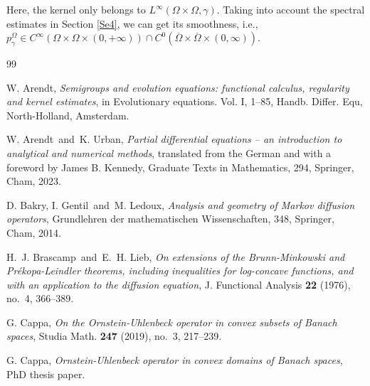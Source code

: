 \documentclass[12pt]{amsart}
\newcommand{\1}{\mathbf 1}
\begin{document}
Here, the kernel only belongs to $L^{\infty}(\Omega\times \Omega,\gamma)$. Taking into account the spectral estimates in Section \ref{Se4}, we can get its smoothness, i.e., $p^\Omega_\gamma\in C^{\infty}(\Omega \times \Omega \times (0,+\infty)) \cap C^{0}(\overline{\Omega}\times \overline{\Omega}\times (0,\infty))$.





\begin{thebibliography}{99}

W. Arendt, {\it Semigroups and evolution equations: functional calculus, regularity and kernel estimates}, in Evolutionary equations. Vol. I, 1--85, Handb. Differ. Equ, North-Holland, Amsterdam.

W. Arendt\ and\ K. Urban, {\em Partial differential equations -- an introduction to analytical and numerical methods}, translated from the German and with a foreword by James B. Kennedy, Graduate Texts in Mathematics, 294, Springer, Cham, 2023.


D. Bakry, I. Gentil\ and\ M. Ledoux, {\em Analysis and geometry of Markov diffusion operators}, Grundlehren der mathematischen Wissenschaften, 348, Springer, Cham, 2014.

H.~J. Brascamp\ and\ E.~H. Lieb, {\em On extensions of the Brunn-Minkowski and Pr\'{e}kopa-Leindler theorems, including inequalities for log-concave functions, and with an application to the diffusion equation}, J. Functional Analysis {\bf 22} (1976), no.~4, 366--389.



G. Cappa, {\it On the Ornstein-Uhlenbeck operator in convex subsets of Banach spaces}, Studia Math. {\bf 247} (2019), no.~3, 217--239.

G. Cappa, {\it Ornstein-Uhlenbeck operator in convex domains of Banach spaces}, PhD thesis paper.


\end{thebibliography}
\end{document}
